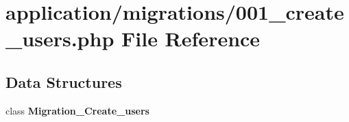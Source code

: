 \section{application/migrations/001\-\_\-create\-\_\-users.php File Reference}
\label{001__create__users_8php}
\subsection*{Data Structures}
\begin{DoxyCompactItemize}
\item 
class {\bf Migration\-\_\-\-Create\-\_\-users}
\end{DoxyCompactItemize}

